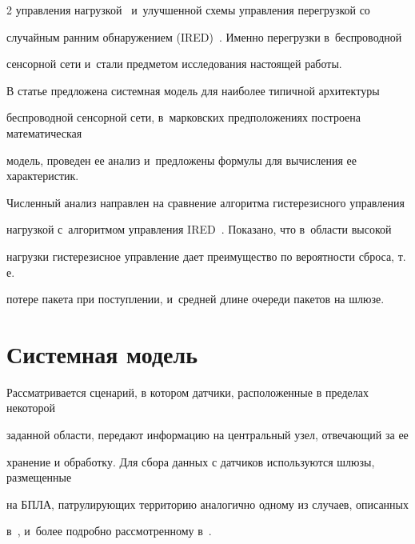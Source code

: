 \begin{multicols}{2}
управления нагрузкой~\cite{6-al, 7-al} и~улучшенной схемы управ\-ле\-ния перегрузкой со 


случайным ранним обнаружением (IRED)~\cite{5-al}. Именно перегрузки в~беспроводной 


сенсорной сети и~стали предметом исследования настоящей работы.


  


  В статье предложена системная модель для наиболее типичной архитектуры 


беспроводной сенсорной сети, в~марковских предположениях по\-стро\-ена математическая 


модель, проведен ее анализ и~предложены формулы для вычисления ее характеристик. 


Численный анализ направлен на сравнение алгоритма гистерезисного управ\-ле\-ния 


нагрузкой с~алгоритмом управ\-ле\-ния IRED~\cite{5-al}. Показано, что в~об\-ласти высокой 


нагрузки гистерезисное управ\-ле\-ние дает преимущество по вероятности сброса, т.\,е.\ 


потере пакета при поступлении, и~средней длине очереди пакетов на шлюзе.





\vspace*{-6pt}


  


\section{Системная модель}





\vspace*{-3pt}





  Рассматривается сценарий, в котором датчики, расположенные в пределах некоторой 


заданной области, передают информацию на центральный узел, отвечающий за ее 


хранение и обработку. Для сбора данных с датчиков используются шлюзы, размещенные 


на БПЛА, патрулирующих территорию аналогично одному из случаев, описанных 


в~\cite{7-al}, и~более подробно рассмотренному в~\cite{8-al}.



\end{multicols}
